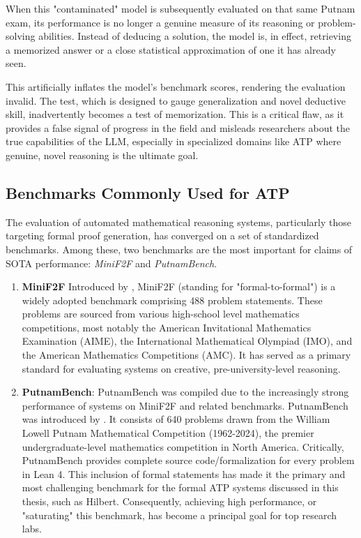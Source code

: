 \documentclass[12pt, letterpaper]{article}
\begin{document}
When this "contaminated" model is subsequently evaluated on that same Putnam exam, its performance is no longer a genuine measure of its reasoning or problem-solving abilities. Instead of deducing a solution, the model is, in effect, retrieving a memorized answer or a close statistical approximation of one it has already seen.

This artificially inflates the model's benchmark scores, rendering the evaluation invalid. The test, which is designed to gauge generalization and novel deductive skill, inadvertently becomes a test of memorization. This is a critical flaw, as it provides a false signal of progress in the field and misleads researchers about the true capabilities of the LLM, especially in specialized domains like ATP where genuine, novel reasoning is the ultimate goal.

\subsection{Benchmarks Commonly Used for ATP}
The evaluation of automated mathematical reasoning systems, particularly those targeting formal proof generation, has converged on a set of standardized benchmarks. Among these, two benchmarks are the most important for claims of SOTA performance: \textit{MiniF2F} and \textit{PutnamBench}.

\begin{enumerate}

    \item \textbf{MiniF2F} Introduced by \citet{zheng2022minif2fcrosssystembenchmarkformal}, MiniF2F (standing for "formal-to-formal") is a widely adopted benchmark comprising 488 problem statements. These problems are sourced from various high-school level mathematics competitions, most notably the American Invitational Mathematics Examination (AIME), the International Mathematical Olympiad (IMO), and the American Mathematics Competitions (AMC). It has served as a primary standard for evaluating systems on creative, pre-university-level reasoning.
    \item \textbf{PutnamBench}: PutnamBench was compiled due to the increasingly strong performance of systems on MiniF2F and related benchmarks. PutnamBench was introduced by \citet{tsoukalas2024putnambenchevaluatingneuraltheoremprovers}. It consists of 640 problems drawn from the William Lowell Putnam Mathematical Competition (1962-2024), the premier undergraduate-level mathematics competition in North America. Critically, PutnamBench provides complete source code/formalization for every problem in Lean 4. This inclusion of formal statements has made it the primary and most challenging benchmark for the formal ATP systems discussed in this thesis, such as Hilbert. Consequently, achieving high performance, or "saturating" this benchmark, has become a principal goal for top research labs. 
\end{enumerate}
\end{document}
